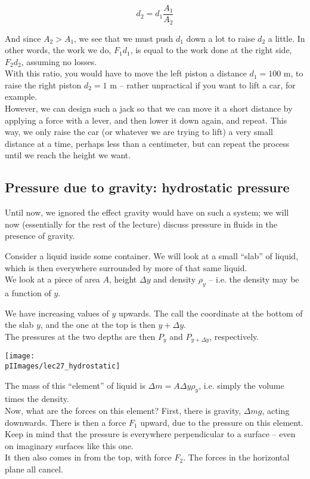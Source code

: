 \begin{equation}
d_2 = d_1 \frac{A_1}{A_2}
\end{equation}

And since $A_2 > A_1$, we see that we must push $d_1$ down a lot to raise $d_2$ a little. In other words, the work we do, $F_1 d_1$, is equal to the work done at the right side, $F_2 d_2$, assuming no losses.\\
With this ratio, you would have to move the left piston a distance $d_1 = 100$ m, to raise the right piston $d_2 = 1$ m -- rather unpractical if you want to lift a car, for example.\\
However, we can design such a jack so that we can move it a short distance by applying a force with a lever, and then lower it down again, and repeat. This way, we only raise the car (or whatever we are trying to lift) a very small distance at a time, perhaps less than a centimeter, but can repeat the process until we reach the height we want.

\subsection{Pressure due to gravity: hydrostatic pressure}

Until now, we ignored the effect gravity would have on such a system; we will now (essentially for the rest of the lecture) discuss pressure in fluids in the presence of gravity.

Consider a liquid inside some container. We will look at a small ``slab'' of liquid, which is then everywhere surrounded by more of that same liquid.\\
We look at a piece of area $A$, height $\Delta y$ and density $\rho_y$ -- i.e. the density may be a function of $y$.

We have increasing values of $y$ upwards. The call the coordinate at the bottom of the slab $y$, and the one at the top is then $y + \Delta y$.\\
The pressures at the two depths are then $P_y$ and $P_{y + \Delta y}$, respectively.

\begin{center}
\texttt{[image: \\pIImages/lec27\_hydrostatic]}
\end{center}

The mass of this ``element'' of liquid is $\Delta m = A \Delta y \rho_y$, i.e. simply the volume times the density.\\
Now, what are the forces on this element? First, there is gravity, $\Delta m g$, acting downwards. There is then a force $F_1$ upward, due to the pressure on this element. Keep in mind that the pressure is everywhere perpendicular to a surface -- even on imaginary surfaces like this one.\\
It then also comes in from the top, with force $F_2$. The forces in the horizontal plane all cancel.

